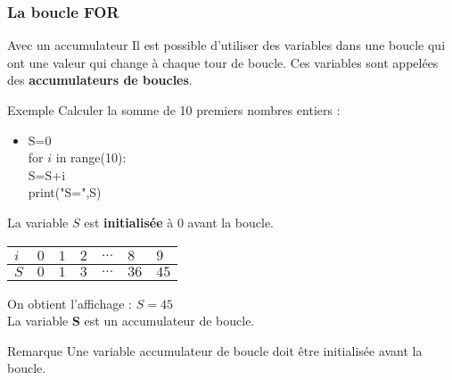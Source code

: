 \documentclass[8pt]{beamer}
\begin{document}
\begin{frame}
\frametitle{La boucle FOR}

\begin{block}{Avec un accumulateur}
Il est possible d'utiliser des variables dans une boucle qui ont une valeur qui change à chaque tour de boucle. Ces variables sont appelées des \textbf{accumulateurs de boucles}.
\end{block}

\begin{exampleblock}{Exemple}
Calculer la somme de 10 premiers nombres entiers :\medskip

\begin{minipage}{0.35\textwidth}
\begin{itemize}
\item S=0\\
for $i$ in range(10):\\
\hspace{0.5cm}S=S+i\\
print("S=",S)
\end{itemize}
\end{minipage}
\begin{minipage}{0.5\textwidth}
La variable $S$ est \textbf{initialisée} à $0$ avant la boucle.\medskip

\begin{tabular}{*{7}{|C{0.6cm}}|}\hline
$i$ & $0$ & $1$ & $2$ & $\ldots$ & $8$ & $9$\\\hline
$S$ & $0$ & $1$ & $3$ & $\ldots$ & $36$ & $45$\\\hline
\end{tabular}
\end{minipage}

\medskip
On obtient l'affichage : $S=45$\\
La variable \textbf{S} est un accumulateur de boucle.
\end{exampleblock}

\begin{alertblock}{Remarque}
Une variable accumulateur de boucle doit être initialisée avant la boucle.
\end{alertblock}

\end{frame}
\end{document}
